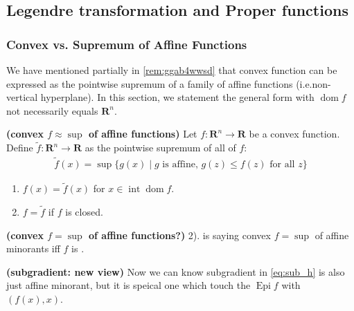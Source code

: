 \documentclass{article}
\newcommand{\bfs}[1]{\textbf{({#1}) }}
\newcommand{\inte}{\operatorname{int}}
\newcommand{\dom}{\operatorname{dom}}
\newcommand{\Epi}{\operatorname{Epi} }
\begin{document}
\subsection{Legendre transformation and Proper functions}
\subsubsection{Convex vs. Supremum of Affine Functions}
We have mentioned partially in \cref{rem:ggab4wwsd} that convex function can be expressed as the pointwise supremum of a family of affine functions (i.e.non-vertical hyperplane). In this section, we statement the general form with $\dom f$ not necessarily equals $\mathbf{R}^n$.
\begin{thma}\bfs{convex $f\approx\sup$ of affine functions}\label{thm:aff_conx}
 Let $f: \mathbf{R}^{n} \rightarrow \mathbf{R}$ be a convex function. Define $\tilde{f}: \mathbf{R}^{n} \rightarrow \mathbf{R}$ as the pointwise supremum of all   of $f:$
\begin{align}
\tilde{f}(x)=\sup \{g(x) \mid g \text { is affine, } g(z) \leq f(z) \text { for all } z\}\label{eq:ggbae}
\end{align}
\begin{enumerate}[1).]
    \item $f(x)=\tilde{f}(x)$ for $x \in\inte \dom f$.
    \item $f=\tilde{f}$ if $f$ is closed.
\end{enumerate}
\end{thma}
\begin{rema}\bfs{convex $f=\sup$ of affine functions?}
2). is saying convex $f=\sup$ of affine minorants iff $f$ is .
\end{rema}
\begin{rema}\bfs{subgradient: new view}
Now we can know subgradient in \cref{eq:sub_h} is also just affine minorant, but it is speical one which touch the $\Epi f$ with $(f(x),x)$.
\end{rema}
\end{document}

